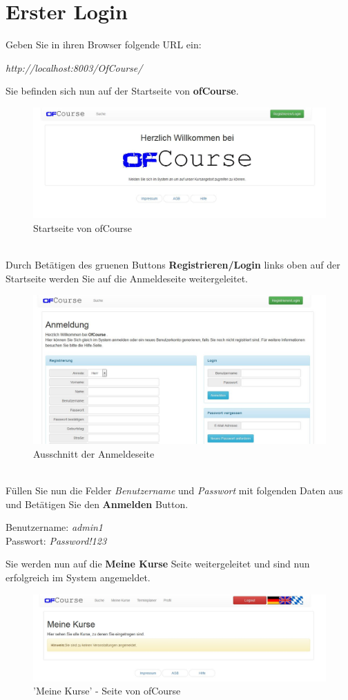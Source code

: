 \documentclass[a4paper, 12pt]{scrreprt}
\begin{document}
\chapter{Erster Login}
Geben Sie in ihren Browser folgende URL ein:
\begin{center}
	{\it http://localhost:8003/OfCourse/}
\end{center}
Sie befinden sich nun auf der Startseite von \textbf{ofCourse}.
\begin{figure}[h]
\centering
\includegraphics[width=0.8\linewidth]{Grafiken/indexPage}
\caption[]{Startseite von ofCourse}
\label{fig:indexPage}
\end{figure} \ \\
Durch Betätigen des  gruenen Buttons \textbf{Registrieren/Login} links oben auf der Startseite werden Sie auf die Anmeldeseite weitergeleitet.
\begin{figure}[h]
\centering
\includegraphics[width=0.8\linewidth]{Grafiken/loginPage}
\caption{Ausschnitt der Anmeldeseite}
\label{fig:loginPage}
\end{figure} \newpage
\ \\
Füllen Sie nun die Felder {\it Benutzername} und {\it Passwort} mit folgenden Daten aus und Betätigen Sie den \textbf{Anmelden} Button.
\begin{center}
	Benutzername: {\it admin1}\\
	Passwort: {\it Password!123}
\end{center}
Sie werden nun auf die \textbf{Meine Kurse} Seite weitergeleitet und sind nun erfolgreich im System angemeldet.
\begin{figure}[h]
\centering
\includegraphics[width=0.8\linewidth]{Grafiken/myCoursesPage}
\caption{'Meine Kurse' - Seite von ofCourse}
\label{fig:myCoursesPage}
\end{figure}
\end{document}
